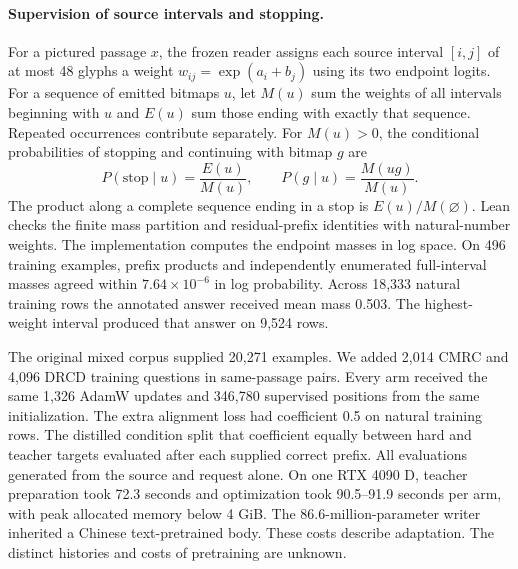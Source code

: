 \paragraph{Supervision of source intervals and stopping.}
For a pictured passage $x$, the frozen reader assigns each source interval $[i,j]$ of at most 48 glyphs a weight $w_{ij}=\exp(a_i+b_j)$ using its two endpoint logits. For a sequence of emitted bitmaps $u$, let $M(u)$ sum the weights of all intervals beginning with $u$ and $E(u)$ sum those ending with exactly that sequence. Repeated occurrences contribute separately. For $M(u)>0$, the conditional probabilities of stopping and continuing with bitmap $g$ are
\[
 P(\mathrm{stop}\mid u)=\frac{E(u)}{M(u)},\qquad
 P(g\mid u)=\frac{M(ug)}{M(u)}.
\]
The product along a complete sequence ending in a stop is $E(u)/M(\varnothing)$. Lean checks the finite mass partition and residual-prefix identities with natural-number weights. The implementation computes the endpoint masses in log space. On 496 training examples, prefix products and independently enumerated full-interval masses agreed within $7.64\times10^{-6}$ in log probability. Across 18,333 natural training rows the annotated answer received mean mass 0.503. The highest-weight interval produced that answer on 9,524 rows.

The original mixed corpus supplied 20,271 examples. We added 2,014 CMRC and 4,096 DRCD training questions in same-passage pairs. Every arm received the same 1,326 AdamW updates and 346,780 supervised positions from the same initialization. The extra alignment loss had coefficient 0.5 on natural training rows. The distilled condition split that coefficient equally between hard and teacher targets evaluated after each supplied correct prefix. All evaluations generated from the source and request alone. On one RTX 4090 D, teacher preparation took 72.3 seconds and optimization took 90.5--91.9 seconds per arm, with peak allocated memory below 4 GiB. The 86.6-million-parameter writer inherited a Chinese text-pretrained body. These costs describe adaptation. The distinct histories and costs of pretraining are unknown.
